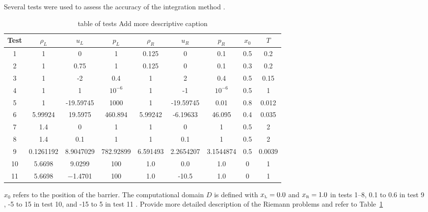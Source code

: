 \documentclass[10pt]{article}
\newcommand{\ee}[1]{{\color{blue} #1}}
\begin{document}

Several tests were used to assess the accuracy of the integration method \citep{LiskaWendroff2003}. 
\begin{table}[h!]
\begin{center}
\begin{tabular}{ |c|c c c|c c c|c c| }
 \hline
 Test & $\rho_L$ & $u_L$ & $p_L$ & $\rho_R$ & $u_R$ & $p_R$ & $x_0$ & $T$ \\
 \hline
 1 & 1 & 0 & 1 & 0.125 & 0 & 0.1 & 0.5 & 0.2 \\
 2 & 1 & 0.75 & 1 & 0.125 & 0 & 0.1 & 0.3 & 0.2 \\
 3 & 1 & -2 & 0.4 & 1 & 2 & 0.4 & 0.5 & 0.15 \\
 4 & 1 & 1 & $10^{-6}$ & 1 & -1 & $10^{-6}$ & 0.5 & 1 \\
 5 & 1 & -19.59745 & 1000 & 1 & -19.59745 & 0.01 & 0.8 & 0.012 \\
 6 & 5.99924 & 19.5975 & 460.894 & 5.99242 & -6.19633 & 46.095 & 0.4 & 0.035 \\
 7 & 1.4 & 0 & 1 & 1 & 0 & 1 & 0.5 & 2 \\
 8 & 1.4 & 0.1 & 1 & 1 & 0.1 & 1 & 0.5 & 2 \\
 9 & 0.1261192 & 8.9047029 & 782.92899 & 6.591493 & 2.2654207 & 3.1544874 & 0.5 & 0.0039 \\
10 & 5.6698 & 9.0299 & 100 & 1.0 & 0.0 & 1.0 & 0 & 1 \\
11 & 5.6698 & −1.4701 & 100 & 1.0 & -10.5 & 1.0 & 0 & 1 \\
 \hline
\end{tabular}
  \caption{table of tests \ee{Add more descriptive caption}}
  \label{tab:testtable}
\end{center}
\end{table}
$x_0$ refers to the position of the barrier. 
The computational domain $D$ is defined with $x_{\mbox{\tiny L}}=0.0$ and $x_{\mbox{\tiny R}}=1.0$ in tests 1--8, 0.1 to 0.6 in test 9 \citep{LiskaWendroff2003}, -5 to 15 in test 10, and -15 to 5 in test 11 \citep{Leveque2002}. 
\ee{Provide more detailed description of the Riemann problems and refer to Table~\ref{tab:testtable}}
\end{document}
